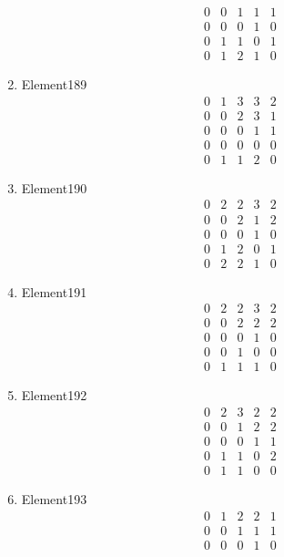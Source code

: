 \documentclass[12pt]{article}
\begin{document}
\begin{multicols}{3}
\begin{enumerate}
\begin{equation*}
\begin{array}{ccccc}
0&0&1&1&1\\
0&0&0&1&0\\
0&1&1&0&1\\
0&1&2&1&0
\end{array}
\end{equation*}
\item Element189
\begin{equation*}
\begin{array}{ccccc}
0&1&3&3&2\\
0&0&2&3&1\\
0&0&0&1&1\\
0&0&0&0&0\\
0&1&1&2&0
\end{array}
\end{equation*}
\item Element190
\begin{equation*}
\begin{array}{ccccc}
0&2&2&3&2\\
0&0&2&1&2\\
0&0&0&1&0\\
0&1&2&0&1\\
0&2&2&1&0
\end{array}
\end{equation*}
\item Element191
\begin{equation*}
\begin{array}{ccccc}
0&2&2&3&2\\
0&0&2&2&2\\
0&0&0&1&0\\
0&0&1&0&0\\
0&1&1&1&0
\end{array}
\end{equation*}
\item Element192
\begin{equation*}
\begin{array}{ccccc}
0&2&3&2&2\\
0&0&1&2&2\\
0&0&0&1&1\\
0&1&1&0&2\\
0&1&1&0&0
\end{array}
\end{equation*}
\item Element193
\begin{equation*}
\begin{array}{ccccc}
0&1&2&2&1\\
0&0&1&1&1\\
0&0&0&1&0\\

\end{array}
\end{equation*}
\end{enumerate}
\end{multicols}
\end{document}
